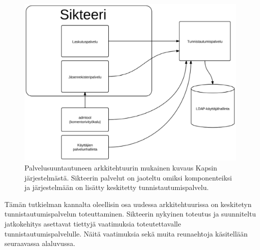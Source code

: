 \begin{figure}[ht]
\centering
\includegraphics[width=.7\textwidth]{toteutus/kapsi_uusi.eps}
\caption{Palvelusuuntautuneen arkkitehtuurin mukainen kuvaus Kapsin järjestelmästä. Sikteerin palvelut on jaoteltu omiksi komponenteiksi ja järjestelmään on lisätty keskitetty tunnistautumispalvelu.}%
\label{kapsi_uusi}
\end{figure}

Tämän tutkielman kannalta oleellisin osa uudessa arkkitehtuurissa on keskitetyn tunnistautumispalvelun toteuttaminen. Sikteerin nykyinen toteutus ja suunniteltu jatkokehitys asettavat tiettyjä vaatimuksia toteutettavalle tunnistautumispalvelulle. Näitä vaatimuksia sekä muita reunaehtoja käsitellään seuraavassa alaluvussa.